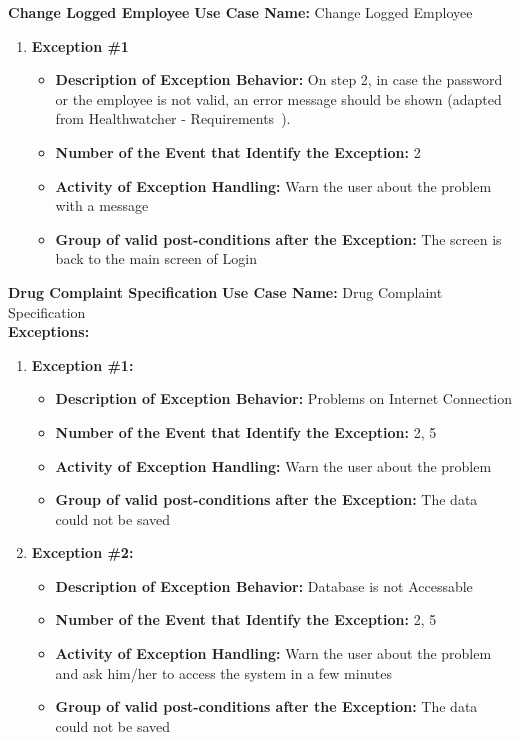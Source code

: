 \documentclass[11pt,twoside]{article}
\begin{document}
\textbf{Change Logged Employee}
\textbf{Use Case Name:} Change Logged Employee\\
\begin{enumerate}
 \item \textbf{Exception \#1}
 \begin{itemize}
  \item \textbf{Description of Exception Behavior:} On step 2, in case the password or the employee is not valid, an error
message should be shown (adapted from Healthwatcher - Requirements~\cite{hw-usecase}).
  \item \textbf{Number of the Event that Identify the Exception:} 2
  \item \textbf{Activity of Exception Handling:} Warn the user about the problem with a message
  \item \textbf{Group of valid post-conditions after the Exception:} The screen is back to the main screen of Login
 \end{itemize}
\end{enumerate}

\textbf{Drug Complaint Specification}
\textbf{Use Case Name:} Drug Complaint Specification\\
\textbf{Exceptions:}
\begin{enumerate}
 \item \textbf{Exception \#1:}
 \begin{itemize}
  \item \textbf{Description of Exception Behavior:} Problems on Internet Connection
  \item \textbf{Number of the Event that Identify the Exception:} 2, 5
  \item \textbf{Activity of Exception Handling:} Warn the user about the problem
  \item \textbf{Group of valid post-conditions after the Exception:} The data could not be saved
 \end{itemize}
 \item \textbf{Exception \#2:}
 \begin{itemize}
  \item \textbf{Description of Exception Behavior:} Database is not Accessable
  \item \textbf{Number of the Event that Identify the Exception:} 2, 5
  \item \textbf{Activity of Exception Handling:} Warn the user about the problem and ask him/her to access the system in a few minutes
  \item \textbf{Group of valid post-conditions after the Exception:} The data could not be saved
 \end{itemize}
\end{enumerate}
\end{document}
